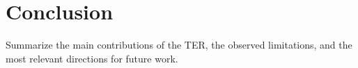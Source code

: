 \chapter{Conclusion}

Summarize the main contributions of the TER, the observed limitations, and the
most relevant directions for future work.
